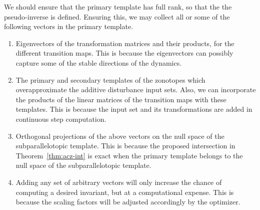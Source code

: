   We should ensure that the primary template has full rank, so that the the pseudo-inverse is defined. Ensuring this, we may collect all or some of
the following vectors in the primary template.
%
\begin{enumerate}
\item Eigenvectors of the transformation matrices and their products, for the
   different transition maps.  This is because the eigenvectors can
  possibly capture some of the stable directions of the dynamics.
\item The primary and secondary templates of the zonotopes which overapproximate the additive disturbance input sets.
  Also, we can incorporate the products of the linear matrices of the
  transition maps with these templates. This is because the input set and
  its transformations are added in continuous step computation.
\item Orthogonal projections of the above vectors on the null
  space of the subparallelotopic template.  This is because the
  proposed intersection in Theorem~\ref{thm:acz-int} is exact when the
  primary template belongs to the null space of the subparallelotopic
  template.
\item Adding any set of arbitrary vectors will only increase the chance of computing a desired
  invariant, but at a computational expense.  This is because the
  scaling factors will be adjusted accordingly by the optimizer. 
\end{enumerate}
